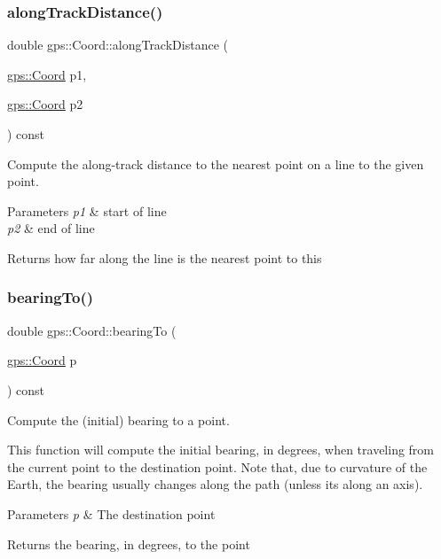 \subsubsection{\texorpdfstring{along\+Track\+Distance()}{alongTrackDistance()}}
{\footnotesize\ttfamily double gps\+::\+Coord\+::along\+Track\+Distance (\begin{DoxyParamCaption}\item[{\hyperlink{classgps_1_1Coord}{gps\+::\+Coord}}]{p1,  }\item[{\hyperlink{classgps_1_1Coord}{gps\+::\+Coord}}]{p2 }\end{DoxyParamCaption}) const}

Compute the along-\/track distance to the nearest point on a line to the given point.


\begin{DoxyParams}{Parameters}
{\em p1} & start of line \\
\hline
{\em p2} & end of line \\
\hline
\end{DoxyParams}
\begin{DoxyReturn}{Returns}
how far along the line is the nearest point to this 
\end{DoxyReturn}
\mbox{\label{classgps_1_1Coord_a304e6cb56296d8d945310d7b931fca4e}} 
\subsubsection{\texorpdfstring{bearing\+To()}{bearingTo()}}
{\footnotesize\ttfamily double gps\+::\+Coord\+::bearing\+To (\begin{DoxyParamCaption}\item[{\hyperlink{classgps_1_1Coord}{gps\+::\+Coord}}]{p }\end{DoxyParamCaption}) const}

Compute the (initial) bearing to a point.

This function will compute the initial bearing, in degrees, when traveling from the current point to the destination point. Note that, due to curvature of the Earth, the bearing usually changes along the path (unless its along an axis).


\begin{DoxyParams}{Parameters}
{\em p} & The destination point \\
\hline
\end{DoxyParams}
\begin{DoxyReturn}{Returns}
the bearing, in degrees, to the point 
\end{DoxyReturn}
\mbox{\label{classgps_1_1Coord_a2d421b8235201290c2a7c5d13eba097e}} 
